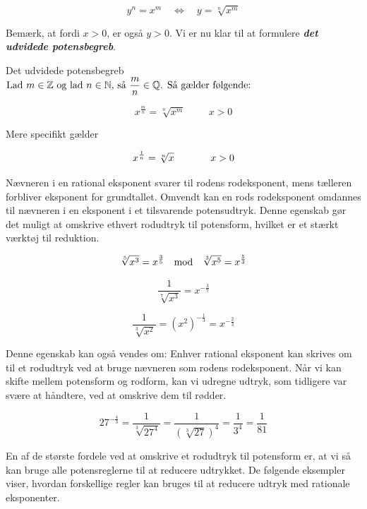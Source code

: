 \begin{equation*}
 y^n=x^m \quad \iff \quad y=\sqrt[n]{x^m}   
\end{equation*}

Bemærk, at fordi \(x > 0\), er også \(y > 0\). Vi er nu klar til at formulere \textbf{\textit{det udvidede potensbegreb}}.

\begin{definition}{Det udvidede potensbegreb}
$\textnormal{Lad } m \in \mathbb{Z} \textnormal{ og lad }  n \in \mathbb{N}\textnormal{, så } \dfrac{m}{n} \in \mathbb{Q}  \textnormal{. Så gælder følgende:}$

\[
x^{\frac{m}{n}} = \sqrt[n]{x^m} \hspace{1cm} x > 0
\]

\textnormal{Mere specifikt gælder}

\[
x^{\frac{1}{n}} = \sqrt[n]{x} \hspace{1.3cm} x > 0
\]

\end{definition}

Nævneren i en rational eksponent svarer til rodens rodeksponent, mens tælleren forbliver eksponent for grundtallet. Omvendt kan en rods rodeksponent omdannes til nævneren i en eksponent i et tilsvarende potensudtryk. Denne egenskab gør det muligt at omskrive ethvert rodudtryk til potensform, hvilket er et stærkt værktøj til reduktion.

\begin{example}

\[
\sqrt[5]{x^3} = x^{\frac{3}{5}} \quad  \textnormal{mod} \quad \sqrt[3]{x^5} = x^{\frac{5}{3}}
\]

\[
\frac{1}{\sqrt[7]{x^3}} = x^{-\frac{3}{7}}
\]

\[
\frac{1}{\sqrt[3]{x^2}} = \left(x^2\right)^{-\frac{1}{3}} = x^{-\frac{2}{3}}
\]
\end{example}

Denne egenskab kan også vendes om: Enhver rational eksponent kan skrives om til et rodudtryk ved at bruge nævneren som rodens rodeksponent. Når vi kan skifte mellem potensform og rodform, kan vi udregne udtryk, som tidligere var svære at håndtere, ved at omskrive dem til rødder.

\begin{example}
\[
27^{-\frac{4}{3}} = \frac{1}{\sqrt[3]{27^4}} = \frac{1}{\left(\sqrt[3]{27}\right)^4} = \frac{1}{3^4} = \frac{1}{81}
\]    
\end{example}

En af de største fordele ved at omskrive et rodudtryk til potensform er, at vi så kan bruge alle potensreglerne til at reducere udtrykket. De følgende eksempler viser, hvordan forskellige regler kan bruges til at reducere udtryk med rationale eksponenter.

